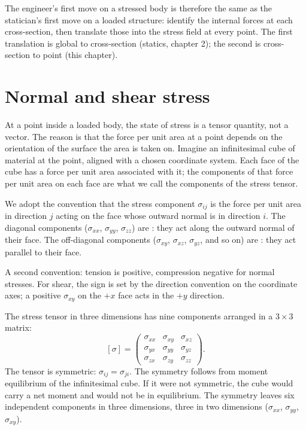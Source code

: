 The engineer's first move on a stressed body is therefore the same as
the statician's first move on a loaded structure: identify the
internal forces at each cross-section, then translate those into the
stress field at every point. The first translation is global to
cross-section (statics, chapter 2); the second is cross-section to
point (this chapter).

\section{Normal and shear stress}

At a point inside a loaded body, the state of stress is a tensor
quantity, not a vector. The reason is that the force per unit area at
a point depends on the orientation of the surface the area is taken
on. Imagine an infinitesimal cube of material at the point, aligned
with a chosen coordinate system. Each face of the cube has a force
per unit area associated with it; the components of that force per
unit area on each face are what we call the components of the stress
tensor.

We adopt the convention that the stress component $\sigma_{ij}$ is
the force per unit area in direction $j$ acting on the face whose
outward normal is in direction $i$. The diagonal components
($\sigma_{xx}$, $\sigma_{yy}$, $\sigma_{zz}$) are : they act along the outward normal of their face. The
off-diagonal components ($\sigma_{xy}$, $\sigma_{xz}$, $\sigma_{yz}$,
and so on) are : they act parallel to their
face.

A second convention: tension is positive, compression negative for
normal stresses. For shear, the sign is set by the direction
convention on the coordinate axes; a positive $\sigma_{xy}$ on the
$+x$ face acts in the $+y$ direction.



The stress tensor in three dimensions has nine components arranged in
a $3 \times 3$ matrix:
\[
[\sigma] = \begin{pmatrix}
\sigma_{xx} & \sigma_{xy} & \sigma_{xz} \\
\sigma_{yx} & \sigma_{yy} & \sigma_{yz} \\
\sigma_{zx} & \sigma_{zy} & \sigma_{zz}
\end{pmatrix}.
\]
The tensor is symmetric: $\sigma_{ij} = \sigma_{ji}$. The symmetry
follows from moment equilibrium of the infinitesimal cube. If it
were not symmetric, the cube would carry a net moment and would not
be in equilibrium. The symmetry leaves six independent components in
three dimensions, three in two dimensions ($\sigma_{xx}$,
$\sigma_{yy}$, $\sigma_{xy}$).

